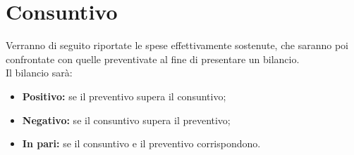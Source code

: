 \section{Consuntivo}\label{Consuntivi}
Verranno di seguito riportate le spese effettivamente sostenute, che saranno poi confrontate con quelle preventivate al fine di presentare un bilancio. \\
Il bilancio sarà:
\begin{itemize}
\item \textbf{Positivo:} se il preventivo supera il consuntivo;
\item \textbf{Negativo:} se il consuntivo supera il preventivo;
\item \textbf{In pari:} se il consuntivo e il preventivo corrispondono.
\end{itemize}
